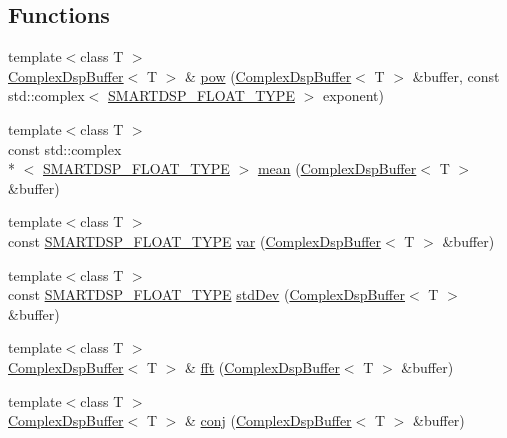 \subsection*{Functions}
\begin{DoxyCompactItemize}
\item 
{\footnotesize template$<$class T $>$ }\\\hyperlink{class_smart_dsp_1_1_complex_dsp_buffer}{Complex\+Dsp\+Buffer}$<$ T $>$ \& \hyperlink{namespace_smart_dsp_a2ca369b14dbf8083a631bcdaf3cf2d67}{pow} (\hyperlink{class_smart_dsp_1_1_complex_dsp_buffer}{Complex\+Dsp\+Buffer}$<$ T $>$ \&buffer, const std\+::complex$<$ \hyperlink{_dsp_buffer_8h_a9ed4123d332590f7a6161bc2061eac49}{S\+M\+A\+R\+T\+D\+S\+P\+\_\+\+F\+L\+O\+A\+T\+\_\+\+T\+Y\+P\+E} $>$ exponent)
\item 
{\footnotesize template$<$class T $>$ }\\const std\+::complex\\*
$<$ \hyperlink{_dsp_buffer_8h_a9ed4123d332590f7a6161bc2061eac49}{S\+M\+A\+R\+T\+D\+S\+P\+\_\+\+F\+L\+O\+A\+T\+\_\+\+T\+Y\+P\+E} $>$ \hyperlink{namespace_smart_dsp_a23a93c1b80dc079a617691d848688eca}{mean} (\hyperlink{class_smart_dsp_1_1_complex_dsp_buffer}{Complex\+Dsp\+Buffer}$<$ T $>$ \&buffer)
\item 
{\footnotesize template$<$class T $>$ }\\const \hyperlink{_dsp_buffer_8h_a9ed4123d332590f7a6161bc2061eac49}{S\+M\+A\+R\+T\+D\+S\+P\+\_\+\+F\+L\+O\+A\+T\+\_\+\+T\+Y\+P\+E} \hyperlink{namespace_smart_dsp_ae32755d9c3637c69e94ccd99e8652591}{var} (\hyperlink{class_smart_dsp_1_1_complex_dsp_buffer}{Complex\+Dsp\+Buffer}$<$ T $>$ \&buffer)
\item 
{\footnotesize template$<$class T $>$ }\\const \hyperlink{_dsp_buffer_8h_a9ed4123d332590f7a6161bc2061eac49}{S\+M\+A\+R\+T\+D\+S\+P\+\_\+\+F\+L\+O\+A\+T\+\_\+\+T\+Y\+P\+E} \hyperlink{namespace_smart_dsp_a9d5b41835ef021f6b4010680a3eb8df4}{std\+Dev} (\hyperlink{class_smart_dsp_1_1_complex_dsp_buffer}{Complex\+Dsp\+Buffer}$<$ T $>$ \&buffer)
\item 
{\footnotesize template$<$class T $>$ }\\\hyperlink{class_smart_dsp_1_1_complex_dsp_buffer}{Complex\+Dsp\+Buffer}$<$ T $>$ \& \hyperlink{namespace_smart_dsp_af6a492e73b6d14c59df6251eb566b227}{fft} (\hyperlink{class_smart_dsp_1_1_complex_dsp_buffer}{Complex\+Dsp\+Buffer}$<$ T $>$ \&buffer)
\item 
{\footnotesize template$<$class T $>$ }\\\hyperlink{class_smart_dsp_1_1_complex_dsp_buffer}{Complex\+Dsp\+Buffer}$<$ T $>$ \& \hyperlink{namespace_smart_dsp_a83055c17daa123a0cfbbfe5495c0d20d}{conj} (\hyperlink{class_smart_dsp_1_1_complex_dsp_buffer}{Complex\+Dsp\+Buffer}$<$ T $>$ \&buffer)

\end{DoxyCompactItemize}
